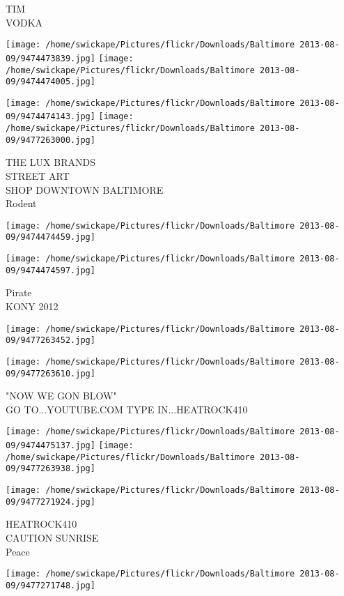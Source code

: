 \documentclass[10pt,letterpaper]{article}
\begin{document}
TIM\\
VODKA
\pagebreak

\texttt{[image: /home/swickape/Pictures/flickr/Downloads/Baltimore 2013-08-09/9474473839.jpg]}
\texttt{[image: /home/swickape/Pictures/flickr/Downloads/Baltimore 2013-08-09/9474474005.jpg]}

\texttt{[image: /home/swickape/Pictures/flickr/Downloads/Baltimore 2013-08-09/9474474143.jpg]}
\texttt{[image: /home/swickape/Pictures/flickr/Downloads/Baltimore 2013-08-09/9477263000.jpg]}

THE LUX BRANDS\\
STREET ART\\
SHOP DOWNTOWN BALTIMORE\\
Rodent
\pagebreak

\texttt{[image: /home/swickape/Pictures/flickr/Downloads/Baltimore 2013-08-09/9474474459.jpg]}

\vspace{0.25in}
\texttt{[image: /home/swickape/Pictures/flickr/Downloads/Baltimore 2013-08-09/9474474597.jpg]}

Pirate\\
KONY 2012
\pagebreak

\texttt{[image: /home/swickape/Pictures/flickr/Downloads/Baltimore 2013-08-09/9477263452.jpg]}

\vspace{0.25in}
\texttt{[image: /home/swickape/Pictures/flickr/Downloads/Baltimore 2013-08-09/9477263610.jpg]}

"NOW WE GON BLOW"\\
GO TO...YOUTUBE.COM TYPE IN...HEATROCK410
\pagebreak

\texttt{[image: /home/swickape/Pictures/flickr/Downloads/Baltimore 2013-08-09/9474475137.jpg]}
\texttt{[image: /home/swickape/Pictures/flickr/Downloads/Baltimore 2013-08-09/9477263938.jpg]}

\vspace{0.25in}
\texttt{[image: /home/swickape/Pictures/flickr/Downloads/Baltimore 2013-08-09/9477271924.jpg]}

HEATROCK410\\
CAUTION SUNRISE\\
Peace
\pagebreak

\texttt{[image: /home/swickape/Pictures/flickr/Downloads/Baltimore 2013-08-09/9477271748.jpg]}
\end{document}

